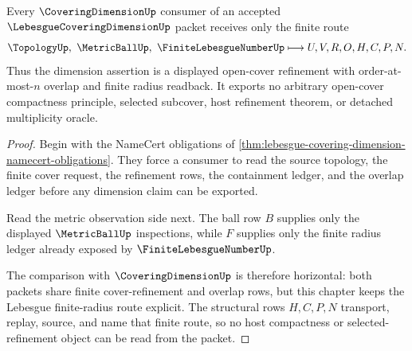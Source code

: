 \begin{theorem}
\label{thm:lebesgue-covering-dimension-finite-refinement-route}
Every $\CoveringDimensionUp$ consumer of an accepted
$\LebesgueCoveringDimensionUp$ packet receives only the finite route
$$
\TopologyUp,\ \MetricBallUp,\ \FiniteLebesgueNumberUp
\longmapsto
U,V,R,O,H,C,P,N .
$$
Thus the dimension assertion is a displayed open-cover refinement with
order-at-most-$n$ overlap and finite radius readback. It exports no arbitrary
open-cover compactness principle, selected subcover, host refinement theorem,
or detached multiplicity oracle.
\end{theorem}
\begin{proof}
Begin with the NameCert obligations of
\autoref{thm:lebesgue-covering-dimension-namecert-obligations}. They force a
consumer to read the source topology, the finite cover request, the refinement
rows, the containment ledger, and the overlap ledger before any dimension
claim can be exported.

Read the metric observation side next. The ball row $B$ supplies only the
displayed $\MetricBallUp$ inspections, while $F$ supplies only the finite
radius ledger already exposed by $\FiniteLebesgueNumberUp$.

The comparison with $\CoveringDimensionUp$ is therefore horizontal: both
packets share finite cover-refinement and overlap rows, but this chapter keeps
the Lebesgue finite-radius route explicit. The structural rows $H,C,P,N$
transport, replay, source, and name that finite route, so no host compactness
or selected-refinement object can be read from the packet.
\end{proof}




